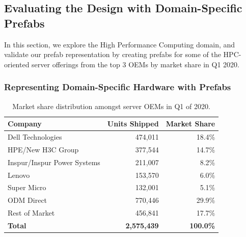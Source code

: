 \documentclass[11pt]{article}
\begin{document}
	\subsection{Evaluating the Design with Domain-Specific Prefabs}
		In this section, we explore the High Performance Computing domain, and validate our prefab representation by creating prefabs for some of the HPC-oriented server offerings from the top 3 OEMs by market share in Q1 2020.
	
		\subsubsection{Representing Domain-Specific Hardware with Prefabs}
			\begin{table}[]
			\centering
				\begin{tabular}{lrr}
				\toprule
				Company                     & Units Shipped      & Market Share     \\ \midrule
				\rowcolor[HTML]{9AFF99} 
				Dell Technologies           & 474,011            & 18.4\%           \\
				\rowcolor[HTML]{9AFF99} 
				HPE/New H3C Group           & 377,544            & 14.7\%           \\
				\rowcolor[HTML]{9AFF99} 
				Inspur/Inspur Power Systems & 211,007            & 8.2\%            \\
				Lenovo                      & 153,570            & 6.0\%            \\
				Super Micro                 & 132,001            & 5.1\%            \\
				ODM Direct                  & 770,446            & 29.9\%           \\
				Rest of Market              & 456,841            & 17.7\%           \\ \midrule
				\textbf{Total}              & \textbf{2,575,439} & \textbf{100.0\%} \\ \bottomrule
				\end{tabular}
			\caption{Market share distribution amongst server OEMs in Q1 of 2020.}
			\label{tab:1}
			\end{table}
\end{document}
